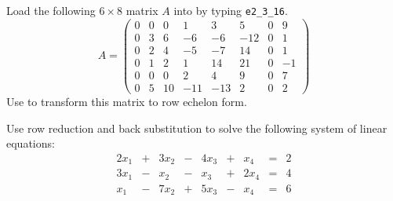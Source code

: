 \documentclass{ximera}
\begin{document}
\begin{exercise} \label{c2.3.2}
Load the following $6\times 8$ matrix $A$ into \Matlab by typing
{\tt e2\_3\_16}.
\begin{equation*}
A=\left(\begin{array}{rrrrrrrr}
0 & 0 &  0 &   1 &   3 &   5 & 0 &  9 \\
0 & 3 &  6 &  -6 &  -6 & -12 & 0 &  1 \\
0 & 2 &  4 &  -5 &  -7 &  14 & 0 &  1 \\
0 & 1 &  2 &   1 &  14 &  21 & 0 & -1 \\
0 & 0 &  0 &   2 &   4 &   9 & 0 &  7 \\
0 & 5 & 10 & -11 & -13 &   2 & 0 &  2
\end{array}\right)
\end{equation*}
Use \Matlab to transform this matrix to row echelon form.
\end{exercise}

\begin{exercise} \label{c2.3.3}
Use row reduction and back substitution to solve the following
system of linear equations:
\[
\begin{array}{rcrcrcrcr}
2x_1 & + &  3x_2 &  - &  4x_3 & + &  x_4 &  = & 2 \\
3x_1 & - &   x_2 &  - &   x_3 & + & 2x_4 &  = & 4 \\
 x_1 & - &  7x_2 &  + &  5x_3 & - &  x_4 &  = & 6
\end{array}
\]
\end{exercise}
\end{document}
